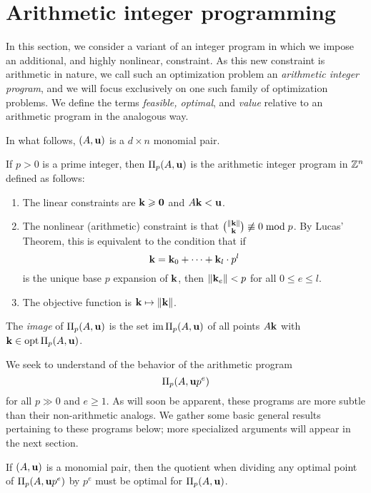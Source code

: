 \documentclass[11pt]{amsart}
\begin{document}
\newpage
\section{Arithmetic integer programming}

In this section, we consider a variant of an integer program in which we impose an additional, and {highly} nonlinear, constraint.  As this new constraint is arithmetic in nature, we call such an optimization problem an \emph{arithmetic integer program}, and we will focus exclusively on one such family of optimization problems.  We define the terms \emph{feasible, optimal}, and \emph{value} relative to an arithmetic program in the analogous way.   

In what follows, $(A, \mathbf{u})$ is a $d \times n$ monomial pair.


\begin{definition} If $p>0$ is a prime integer, then $\Pi_p(A, \mathbf{u})$ is the arithmetic integer program in $\mathbb{Z}^n$ defined as follows:
\begin{enumerate}
\item The linear constraints are $\mathbf{k} \geqslant \mathbf{0}$ and $A \mathbf{k} < \mathbf{u}$.  
\item The nonlinear (arithmetic) constraint is that $\binom{\| \mathbf{k} \|}{\mathbf{k}} \not \equiv 0 \bmod p$.  By Lucas' Theorem, this is equivalent to the condition that  if \[ \mathbf{k} = \mathbf{k}_0 + \cdots + \mathbf{k}_l \cdot  p^l\] is the unique base $p$ expansion of $\mathbf{k}$, then $\| \mathbf{k}_e \| < p$ for all $0 \leq e \leq l $.
\item The objective function is $\mathbf{k} \mapsto \| \mathbf{k} \|$.
\end{enumerate}

\end{definition}

\begin{definition}
The \emph{image} of $\Pi_p(A, \mathbf{u})$ is the set $\operatorname{im} \Pi_p(A, \mathbf{u})$ of all points  $A \mathbf{k}$ with $\mathbf{k} \in \operatorname{opt} \Pi_p(A, \mathbf{u})$. 
\end{definition}

We seek to understand of the behavior of the arithmetic program \[ \Pi_p(A, \mathbf{u}p^e)\] for all $p \gg 0$ and $e \geq 1$.    As will soon be apparent, these programs are more subtle than their non-arithmetic analogs.  We gather some basic general results pertaining to these programs below;  more specialized arguments will appear in the next section.

\begin{lemma} 
\label{optimal division: L}  If $(A, \mathbf{u})$ is a monomial pair, then the quotient when dividing any optimal point of $\Pi_p(A, \mathbf{u}p^e)$ by $p^e$ must be optimal for $\Pi_p(A, \mathbf{u})$.
\end{lemma}
\end{document}
